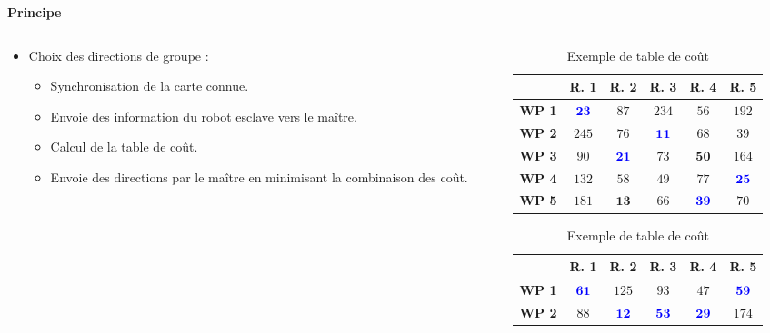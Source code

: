 \documentclass[aspectratio=169,10pt]{beamer}
\begin{document}
\begin{frame}{\textbf{Principe}}
	\begin{columns}
		\begin{column}{0.5\textwidth}
			\begin{itemize}
				\item Choix des directions de groupe :
				\begin{itemize}
					\item Synchronisation de la carte connue.
					\vspace{0.2cm}
					\item Envoie des information du robot esclave vers le maître.
					\vspace{0.2cm}
					\item Calcul de la table de coût.
					\vspace{0.2cm}
					\item Envoie des directions par le maître en minimisant la combinaison des coût.
				\end{itemize}
			\end{itemize}
		\end{column}
		\begin{column}{0.5\textwidth}
			\begin{table}[H]
				\centering
				\begin{tabular}{c c c c c c}
					\hline
					& \textbf{R. 1} & \textbf{R. 2} & \textbf{R. 3} & \textbf{R. 4} & \textbf{R. 5}\\
					\hline
					\textbf{WP 1} & \textcolor{blue}{$\mathbf{23}$} & $87$ & $234$ & $56$ & $192$ \\
					\textbf{WP 2} & $245$ & $76$ & \textcolor{blue}{$\mathbf{11}$} & $68$ & $39$ \\
					\textbf{WP 3} & $90$ & \textcolor{blue}{$\mathbf{21}$} & $73$ & $\mathbf{50}$ & $164$ \\
					\textbf{WP 4} & $132$ & $58$ & $49$ & $77$ & \textcolor{blue}{$\mathbf{25}$} \\
					\textbf{WP 5} & $181$ & $\mathbf{13}$ & $66$ & \textcolor{blue}{$\mathbf{39}$} & $70$ \\ 
					\hline
				\end{tabular}
				\caption{Exemple de table de coût}
				\label{tab:example_5R5WP}
			\end{table}
			\begin{table}[H]
				\centering
				\begin{tabular}{c c c c c c}
					\hline
					& \textbf{R. 1} & \textbf{R. 2} & \textbf{R. 3} & \textbf{R. 4} & \textbf{R. 5}\\
					\hline
					\textbf{WP 1} & \textcolor{blue}{$\mathbf{61}$} & $125$ & $93$ & $47$ & \textcolor{blue}{$\mathbf{59}$} \\
					\textbf{WP 2} & $88$ & \textcolor{blue}{$\mathbf{12}$} & \textcolor{blue}{$\mathbf{53}$} & \textcolor{blue}{$\mathbf{29}$} & $174$ \\ 
					\hline
				\end{tabular}
				\caption{Exemple de table de coût}
				\label{tab:example_5R2WP}
			\end{table}
		\end{column}
	\end{columns}
\end{frame}
\end{document}
